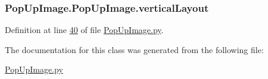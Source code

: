 \subsubsection[{\texorpdfstring{vertical\+Layout}{verticalLayout}}]{\setlength{\rightskip}{0pt plus 5cm}Pop\+Up\+Image.\+Pop\+Up\+Image.\+vertical\+Layout}\hypertarget{classPopUpImage_1_1PopUpImage_a2bacc8ca805321016053553bc3b27a20}{}\label{classPopUpImage_1_1PopUpImage_a2bacc8ca805321016053553bc3b27a20}


Definition at line \hyperlink{PopUpImage_8py_source_l00040}{40} of file \hyperlink{PopUpImage_8py_source}{Pop\+Up\+Image.\+py}.



The documentation for this class was generated from the following file\+:\begin{DoxyCompactItemize}
\item 
\hyperlink{PopUpImage_8py}{Pop\+Up\+Image.\+py}\end{DoxyCompactItemize}
